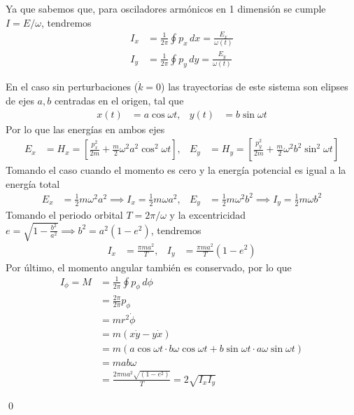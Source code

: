 \documentclass[]{article}
\numberwithin{equation}{section}
\begin{document}
\begin{enumerate}
	Ya que sabemos que, para osciladores armónicos en 1 dimensión se cumple $I = E/\omega$, tendremos
	\begin{align}
		I_x &= \frac{1}{2\pi} \oint p_x \, dx = \frac{E_x}{\omega(t)}\\
		I_y &= \frac{1}{2\pi} \oint p_y \, dy = \frac{E_y}{\omega(t)}
	\end{align}
	
	En el caso sin perturbaciones ($\dot{k} = 0$) las trayectorias de este sistema son elipses de ejes $a, b$ centradas en el origen, tal que
	\begin{align}
		x(t) &= a \cos\omega t, & y(t) &= b \sin\omega t
	\end{align}
	Por lo que las energías en ambos ejes
	\begin{align*}
		E_x &= H_x = \left[\frac{p_x^2}{2m} + \frac{m}{2} \omega^2 a^2 \cos^2\omega t \right], & E_y &= H_y = \left[\frac{p_y^2}{2m} + \frac{m}{2} \omega^2 b^2 \sin^2\omega t\right]
	\end{align*}
	Tomando el caso cuando el momento es cero y la energía potencial es igual a la energía total
	\begin{align}
		E_x &= \frac{1}{2} m \omega^2 a^2 \implies I_x = \frac{1}{2} m \omega a^2, & E_y &= \frac{1}{2} m \omega^2 b^2 \implies I_y = \frac{1}{2} m \omega b^2
	\end{align}
	Tomando el periodo orbital $T = 2\pi/\omega$ y la excentricidad $e = \sqrt{1 - \frac{b^2}{a^2}} \implies b^2 = a^2 (1 - e^2)$, tendremos
	\begin{align}
		I_x &= \frac{\pi m a^2}{T}, & I_y &= \frac{\pi m a^2}{T} (1 - e^2)
	\end{align}
	Por último, el momento angular también es conservado, por lo que
	\begin{align}
		I_\phi = M &= \frac{1}{2\pi} \oint p_\phi \, d\phi \nonumber\\
		&= \frac{2\pi}{2\pi} p_\phi \nonumber\\
		&= m r^2 \dot{\phi}\nonumber\\
		&= m (x \dot{y} - y \dot{x})\nonumber\\
		&= m (a \cos\omega t \cdot b \omega \cos\omega t + b \sin\omega t \cdot a \omega \sin\omega t) \nonumber\\
		&= m a b\omega \nonumber\\
		&= \frac{2\pi m a^2 \sqrt{\left(1 - e^2\right)}}{T} = 2\sqrt{I_x I_y}
	\end{align}
	
	\qed
	

\end{enumerate}
\end{document}
